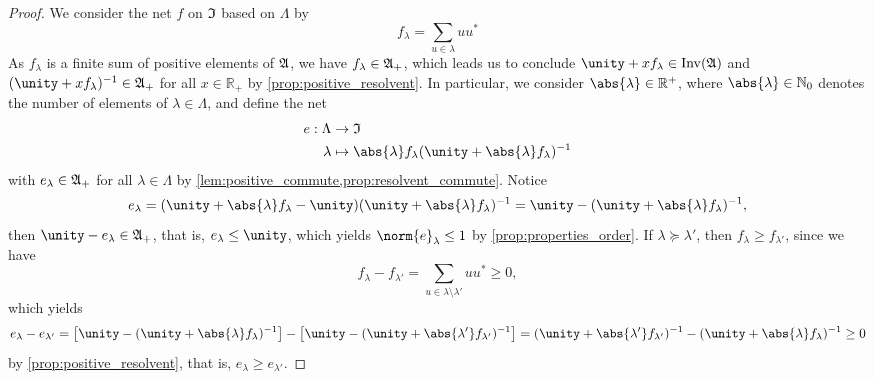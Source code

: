 \begin{proof}
    We consider the net \(f\) on \(\mathfrak{I}\) based on \(\Lambda\) by
    \begin{equation*}
        f_{\lambda} = \sum_{u \in \lambda} uu^*
    \end{equation*}
    As \(f_{\lambda}\) is a finite sum of positive elements of \(\mathfrak{A}\), we have \(f_{\lambda} \in \mathfrak{A}_+\), which leads us to conclude \(\unity + x f_{\lambda} \in \invertible{\algebra{A}}\) and \((\unity + x f_{\lambda})^{-1} \in \algebra{A}_+\) for all \(x \in \mathbb{R}_+\) by \cref{prop:positive_resolvent}. In particular, we consider \(\abs{\lambda} \in \mathbb{R}^+\), where \(\abs{\lambda} \in \mathbb{N}_0\) denotes the number of elements of \(\lambda \in \Lambda\), and define the net
    \begin{align*}
        e : \Lambda &\to \algebra{I}\\
            \lambda &\mapsto \abs{\lambda} f_{\lambda} (\unity + \abs{\lambda} f_{\lambda})^{-1}
    \end{align*}
    with \(e_{\lambda} \in \mathfrak{A}_+\) for all \(\lambda \in \Lambda\) by \cref{lem:positive_commute,prop:resolvent_commute}. Notice
    \begin{equation*}
        e_{\lambda} = (\unity + \abs{\lambda} f_{\lambda} - \unity)(\unity + \abs{\lambda}f_{\lambda})^{-1} = \unity - (\unity + \abs{\lambda} f_{\lambda})^{-1},
    \end{equation*}
    then \(\unity - e_{\lambda} \in \algebra{A}_+\), that is, \(e_{\lambda} \leq \unity\), which yields \(\norm{e}_{\lambda} \leq 1\) by \cref{prop:properties_order}. If \(\lambda \succeq \lambda'\), then \(f_{\lambda} \geq f_{\lambda'}\),  since we have
    \begin{equation*}
        f_{\lambda} - f_{\lambda'} = \sum_{u \in \lambda \setminus \lambda'} uu^* \geq 0,
    \end{equation*}
    which yields
    \begin{equation*}
        e_{\lambda} - e_{\lambda'} = \left[\unity - (\unity + \abs{\lambda} f_{\lambda})^{-1}\right] - \left[\unity - (\unity + \abs{\lambda'} f_{\lambda'})^{-1}\right] = (\unity + \abs{\lambda'}f_{\lambda'})^{-1} - (\unity + \abs{\lambda}f_{\lambda})^{-1} \geq 0
    \end{equation*}
    by \cref{prop:positive_resolvent}, that is, \(e_{\lambda} \geq e_{\lambda'}\).


\end{proof}
